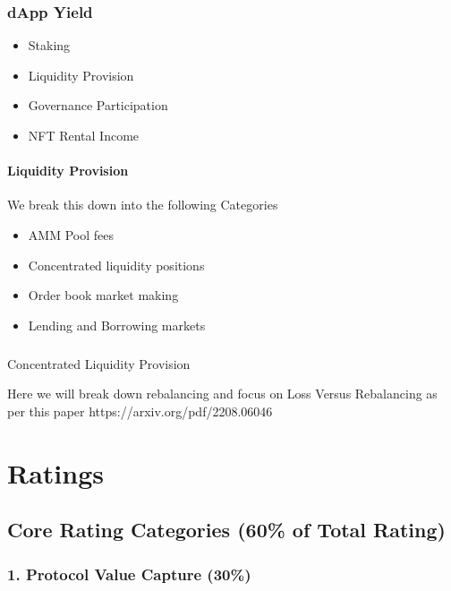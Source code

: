 \documentclass[
  letterpaper,
  DIV=11,
  numbers=noendperiod]{scrreprt}
\makeatletter
\let\oldparagraph\paragraph
\renewcommand{\paragraph}{
    \@ifstar
      \xxxParagraphStar
      \xxxParagraphNoStar
  }
\newcommand{\xxxParagraphStar}[1]{\oldparagraph*{#1}\mbox{}}
\newcommand{\xxxParagraphNoStar}[1]{\oldparagraph{#1}\mbox{}}
\providecommand{\tightlist}{%
  \setlength{\itemsep}{0pt}\setlength{\parskip}{0pt}}\usepackage{longtable,booktabs,array}
\makeatother
\begin{document}
\subsection{dApp Yield}\label{dapp-yield}

\begin{itemize}
\tightlist
\item
  Staking
\item
  Liquidity Provision
\item
  Governance Participation
\item
  NFT Rental Income
\end{itemize}

\subsubsection{Liquidity Provision}\label{liquidity-provision}

We break this down into the following Categories

\begin{itemize}
\tightlist
\item
  AMM Pool fees
\item
  Concentrated liquidity positions
\item
  Order book market making
\item
  Lending and Borrowing markets
\end{itemize}

\paragraph{Concentrated Liquidity
Provision}\label{concentrated-liquidity-provision}

Here we will break down rebalancing and focus on Loss Versus Rebalancing
as per this paper https://arxiv.org/pdf/2208.06046

\chapter{Ratings}\label{ratings}

\section{Core Rating Categories (60\% of Total
Rating)}\label{core-rating-categories-60-of-total-rating}

\subsection{1. Protocol Value Capture
(30\%)}\label{protocol-value-capture-30}
\end{document}
